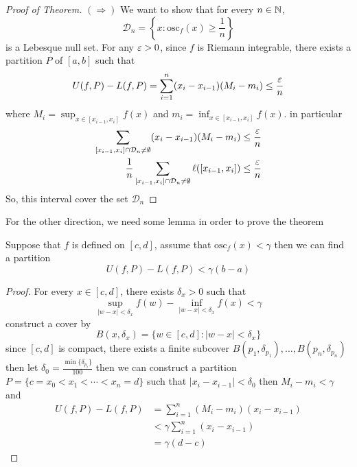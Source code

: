 \begin{proof}[Proof of Theorem]
  $(\Rightarrow)$ We want to show that for every $n \in \mathbb N$, 
  \[\mathcal{D}_n = \left\{x : \mathrm{osc}_f(x) \ge \frac1n\right\}\]
  is a Lebesque null set. For any $\varepsilon > 0$, since $f$ is Riemann integrable, 
  there exists a partition $P$ of $[a, b]$ such that 
  \[U(f, P) - L(f, P) = \sum_{i = 1}^n (x_i - x_{i-1})(M_i - m_i) \le \frac{\varepsilon} n\]
  where $M_i = \sup_{x\in[x_{i-1}, x_i]}f(x)$ and $m_i = \inf_{x\in[x_{i-1}, x_i]}f(x)$.
  in particular
  \begin{align*}
    \sum_{[x_{i-1}, x_i]\cap \mathcal{D}_n \neq \emptyset}(x_i - x_{i-1})(M_i - m_i) &\le \frac{\varepsilon} n\\
    \frac1n\sum_{[x_{i-1}, x_i]\cap \mathcal{D}_n \neq \emptyset} \ell([x_{i-1}, x_i]) &\le \frac{\varepsilon} n
  \end{align*}
  So, this interval cover the set $\mathcal{D}_n$
\end{proof}
For the other direction, we need some lemma in order to prove the theorem
\begin{lemma}
  Suppose that $f$ is defined on $[c, d]$, assume that $\mathrm{osc}_f(x) < \gamma$
  then we can find a partition 
  \[U(f, P) - L(f, P) < \gamma(b-a)\]
\end{lemma}
\begin{proof}
  For every $x \in [c, d]$, there exists $\delta_x > 0$ such that
  \[\sup_{|w-x| < \delta_x} f(w) - \inf_{|w-x| < \delta_x} f(x) < \gamma\]
  construct a cover by \[B(x, \delta_x) = \{w\in[c,d] : |w-x| < \delta_x\}\]
  since $[c, d]$ is compact, there exists a finite subcover $B(p_1, \delta_{p_1}), \dotsc, B(p_n, \delta_{p_n})$
  then let $\delta_0 = \frac{\min\{\delta_{p_i}\}}{100}$ 
  then we can construct a partition $P = \{c = x_0 < x_1 < \cdots < x_n = d\}$ such that $|x_i - x_{i-1}| < \delta_0$
  then $M_i - m_i < \gamma$ and 
  \begin{align*}
    U(f, P) - L(f, P) &= \sum_{i=1}^{n}(M_i - m_i)(x_i - x_{i-1})\\
    &< \gamma\sum_{i=1}^{n}(x_i - x_{i-1})\\
    &= \gamma(d-c)
  \end{align*}
\end{proof}